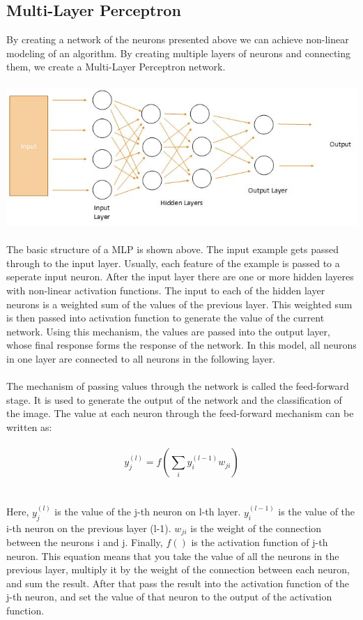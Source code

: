 \documentclass[paper=a4, fontsize=11pt]{scrartcl} %
\numberwithin{equation}{section} %
\numberwithin{figure}{section} %
\numberwithin{table}{section} %
\begin{document}
	\subsection{Multi-Layer Perceptron}
	By creating a network of the neurons presented above we can achieve non-linear modeling of an algorithm. By creating multiple layers of neurons and connecting them, we create a Multi-Layer Perceptron network.
	\\\\
	\hspace*{-.1cm}\includegraphics[scale=0.9]{mlp}
	\\\\
	The basic structure of a MLP is shown above. The input example gets passed through to the input layer. Usually, each feature of the example is passed to a seperate input neuron. After the input layer there are one or more hidden layeres with non-linear activation functions. The input to each of the hidden layer neurons is a weighted sum of the values of the previous layer. This weighted sum is then passed into activation function to generate the value of the current network. Using this mechanism, the values are passed into the output layer, whose final response forms the response of the network. In this model, all neurons in one layer are connected to all neurons in the following layer. 
	\\\\
	The mechanism of passing values through the network is called the feed-forward stage. It is used to generate the output of the network and the classification of the image. The value at each neuron through the feed-forward mechanism can be written as:
	\\\\
	$$y^{(l)}_j = f( \sum_{i} y^{(l-1)}_i w_{ji})$$
	\\\\
	Here, $y^{(l)}_j$ is the value of the j-th neuron on l-th layer. $y^{(l-1)}_i$ is the value of the i-th neuron on the previous layer (l-1). $w_{ji}$ is the weight of the connection between the neurons i and j. Finally, $f()$ is the activation function of j-th neuron. This equation means that you take the value of all the neurons in the previous layer, multiply it by the weight of the connection between each neuron, and sum the result. After that pass the result into the activation function of the j-th neuron, and set the value of that neuron to the output of the activation function.
\end{document}
